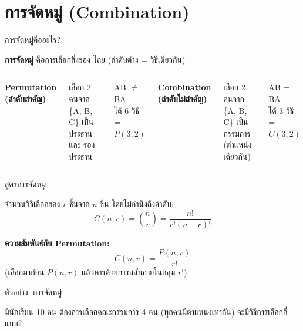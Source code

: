 \documentclass[11pt, aspectratio=169]{beamer}
\begin{document}
\section{การจัดหมู่ (Combination)}

\begin{frame}{การจัดหมู่คืออะไร?}
  \begin{explanation}
    \textbf{การจัดหมู่} คือการเลือกสิ่งของ โดย 
    (ลำดับต่าง = วิธีเดียวกัน)
  \end{explanation}

  \begin{columns}[T]
      \centering
      \textbf{Permutation (ลำดับสำคัญ)}

      \medskip
      เลือก 2 คนจาก \{A, B, C\} เป็น\\
      ประธาน และ รองประธาน

      \medskip
      AB $\neq$ BA \\
      ได้ 6 วิธี = $P(3,2)$

      \centering
      \textbf{Combination (ลำดับไม่สำคัญ)}

      \medskip
      เลือก 2 คนจาก \{A, B, C\} เป็น\\
      กรรมการ (ตำแหน่งเดียวกัน)

      \medskip
      AB = BA \\
      ได้ 3 วิธี = $C(3,2)$
  \end{columns}
\end{frame}

\begin{frame}{สูตรการจัดหมู่}
  \begin{explanation}[สูตร]
    จำนวนวิธีเลือกของ $r$ ชิ้นจาก $n$ ชิ้น โดยไม่คำนึงถึงลำดับ:
    \[
      C(n, r) = \binom{n}{r} = \frac{n!}{r!(n-r)!}
    \]

    \medskip
    \textbf{ความสัมพันธ์กับ Permutation:}
    \[
      C(n, r) = \frac{P(n, r)}{r!}
    \]
    (เลือกมาก่อน $P(n,r)$ แล้วหารด้วยการสลับภายในกลุ่ม $r!$)
  \end{explanation}
\end{frame}

\begin{frame}[t]{ตัวอย่าง: การจัดหมู่}
  \begin{exambox}[โจทย์ 1]
    มีนักเรียน 10 คน ต้องการเลือกคณะกรรมการ 4 คน
    (ทุกคนมีตำแหน่งเท่ากัน) จะมีวิธีการเลือกกี่แบบ?
  \end{exambox}

  \vspace{\fill}
\end{frame}
\end{document}
